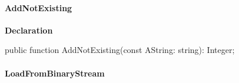 \documentclass{report}
\newif\ifpdf
\begin{document}
\paragraph*{AddNotExisting}\hspace*{\fill}

\label{PasDoc_StringVector.TStringVector-AddNotExisting}
\begin{list}{}{
\setlength{\itemindent}{0cm}
\setlength{\listparindent}{0cm}
\setlength{\leftmargin}{\evensidemargin}
\addtolength{\leftmargin}{\tmplength}
\settowidth{\labelsep}{X}
\addtolength{\leftmargin}{\labelsep}
\setlength{\labelwidth}{\tmplength}
}
\item[\textbf{Declaration}\hfill]
\ifpdf
\begin{flushleft}
\fi
\begin{ttfamily}
public function AddNotExisting(const AString: string): Integer;\end{ttfamily}

\ifpdf
\end{flushleft}
\fi

\end{list}
\paragraph*{LoadFromBinaryStream}\hspace*{\fill}
\end{document}
